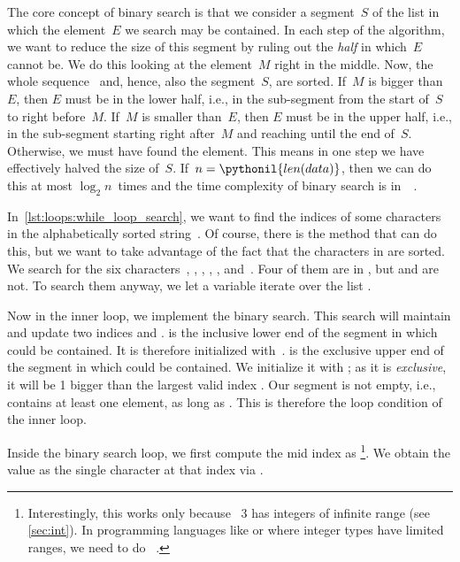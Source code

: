 The core concept of binary search is that we consider a segment~$S$ of the list in which the element~$E$ we search may be contained.
In each step of the algorithm, we want to reduce the size of this segment by ruling out the \emph{half} in which~$E$ cannot be.
We do this looking at the element~$M$ right in the middle.
Now, the whole sequence~ and, hence, also the segment~$S$, are sorted.
If~$M$ is bigger than~$E$, then $E$ must be in the lower half, i.e., in the sub-segment from the start of~$S$ to right before~$M$.
If~$M$ is smaller than~$E$, then $E$ must be in the upper half, i.e., in the sub-segment starting right after~$M$ and reaching until the end of~$S$.
Otherwise, we must have found the element.
This means in one step we have effectively halved the size of~$S$.
If~$n=\pythonil{len(data)}$, then we can do this at most $\log_2 n$~times and the time complexity of binary search is in~~\cite{K1998SAS,H2024POIC:BS,B1999PP}.%
%
\begin{sloppypar}%
In~\cref{lst:loops:while_loop_search}, we want to find the indices of some characters in the alphabetically sorted string~.
Of course, there is the  method that can do this, but we want to take advantage of the fact that the characters in  are sorted.
We search for the six characters~, , , , , and~.
Four of them are in , but  and  are not.
To search them anyway, we let a variable  iterate over the list \pythonil{["a", "c", "o", "p", "w", "z"]}.%
\end{sloppypar}%
%
Now in the inner loop, we implement the binary search.
This search will maintain and update two indices  and .
 is the inclusive lower end of the segment in which  could be contained.
It is therefore initialized with~.
 is the exclusive upper end of the segment in which  could be contained.
We initialize it with ; as it is \emph{exclusive}, it will be 1 bigger than the largest valid index .
Our segment is not empty, i.e., contains at least one element, as long as .
This is therefore the loop condition of the inner loop.

Inside the binary search loop, we first compute the mid index as \footnote{%
Interestingly, this works only because \python~3 has integers of infinite range (see \cref{sec:int}). %
In programming languages like  or  where integer types have limited ranges, we need to do ~\cite{H2024POIC:BS}.%
}.
We obtain the value  as the single character at that index via .

